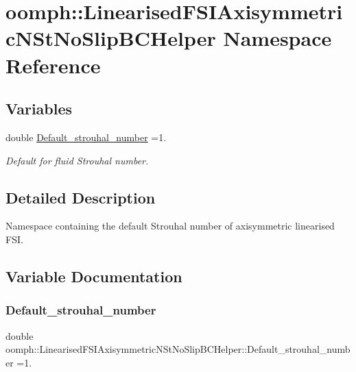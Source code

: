 \hypertarget{namespaceoomph_1_1LinearisedFSIAxisymmetricNStNoSlipBCHelper}{}\section{oomph\+:\+:Linearised\+F\+S\+I\+Axisymmetric\+N\+St\+No\+Slip\+B\+C\+Helper Namespace Reference}
\label{namespaceoomph_1_1LinearisedFSIAxisymmetricNStNoSlipBCHelper}
\subsection*{Variables}
\begin{DoxyCompactItemize}
\item 
double \hyperlink{namespaceoomph_1_1LinearisedFSIAxisymmetricNStNoSlipBCHelper_ae7b6db5ae88b731f215b032085d18694}{Default\+\_\+strouhal\+\_\+number} =1.
\begin{DoxyCompactList}\small\item\em Default for fluid Strouhal number. \end{DoxyCompactList}\end{DoxyCompactItemize}


\subsection{Detailed Description}
Namespace containing the default Strouhal number of axisymmetric linearised F\+SI. 

\subsection{Variable Documentation}
\mbox{\label{namespaceoomph_1_1LinearisedFSIAxisymmetricNStNoSlipBCHelper_ae7b6db5ae88b731f215b032085d18694}} 
\subsubsection{\texorpdfstring{Default\+\_\+strouhal\+\_\+number}{Default\_strouhal\_number}}
{\footnotesize\ttfamily double oomph\+::\+Linearised\+F\+S\+I\+Axisymmetric\+N\+St\+No\+Slip\+B\+C\+Helper\+::\+Default\+\_\+strouhal\+\_\+number =1.}



